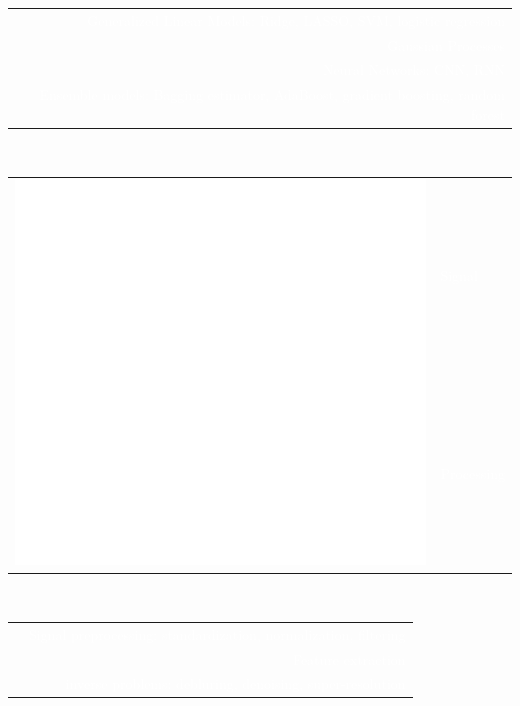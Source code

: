 \documentclass[letterpaper]{article}
\begin{document}
\begin{minipage}[t]{1.\linewidth}
\begin{minipage}{0.47\linewidth}
{\begin{minipage}{1\linewidth}
\begin{minipage}{1\linewidth}
\begin{minipage}[t]{0.47\linewidth}
			\vspace{1ex}
			\begin{minipage}{1\linewidth}
				\textcolor{white}{\small
				\begin{tabularx}{1\textwidth}{lR}
					\smallskip
					& \textmd{Generalized Linear Models:} {\scriptsize Ridge, 
					LASSO, SVM, logistic regression}\\
					\smallskip
					& \textmd{Gaussian Processes}\\
					\smallskip
					& \textmd{Neural Networks:} {\scriptsize CNN, RNN}\\
					\smallskip
					& \textmd{Ensemble models:} {\scriptsize Bagging estimator, 
					AdaBoost, gradient boosting, random forest}\\
				\end{tabularx}
				} 
			\end{minipage}
			\vspace{2ex}
		\end{minipage}
	\end{minipage}\\ %
	\begin{minipage}{1\linewidth} %
		\begin{minipage}[t]{0.47\linewidth}
			\begin{tabularx}{1\textwidth}{rX}
				\multirow{2}{*}{\includegraphics[width=0.18\linewidth]{signal.eps}}
				& \large\textmd{\textcolor{white}{Signal}}\\
				& \large\textmd{\textcolor{white}{Processing}}\\
			\end{tabularx}\\
			\vspace{1ex}
			\begin{minipage}{1\linewidth}
				\textcolor{white}{\small
				\begin{tabularx}{1\textwidth}{cR}
					& \textmd{Signal preprocessing:} {\scriptsize 
					standardization, normalization, filtering}\\
					& \textmd{Feature extraction} \\
					& \textmd{inverse problems:} {\scriptsize debluring, 
					denoising, 
					super-resolution}\\
				\end{tabularx}
}
\end{minipage}
\end{minipage}
\end{minipage}
\end{minipage}}
\end{minipage}
\end{minipage}
\end{document}
